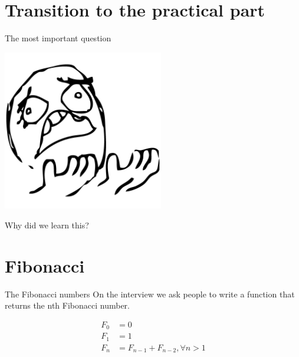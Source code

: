 \documentclass[presentation,aspectratio=169,smaller]{beamer}
\begin{document}
\section*{Transition to the practical part}
\label{sec:org7e15353}

\begin{frame}[label={sec:org588bd94}]{The most important question}
\begin{center}
\includegraphics[height=7cm]{images/whyyy.png}
\end{center}

Why did we learn this?
\end{frame}

\section*{Fibonacci}
\label{sec:orgf20d8e4}

\begin{frame}[label={sec:org6f455f1}]{The Fibonacci numbers}
On the interview we ask people to write a function that returns the nth
Fibonacci number.

\begin{align*}
  F_0 &= 0 \\
  F_1 &= 1 \\
  F_n &= F_{n - 1} + F_{n - 2}, \forall n > 1 \\
\end{align*}
\end{frame}
\end{document}
